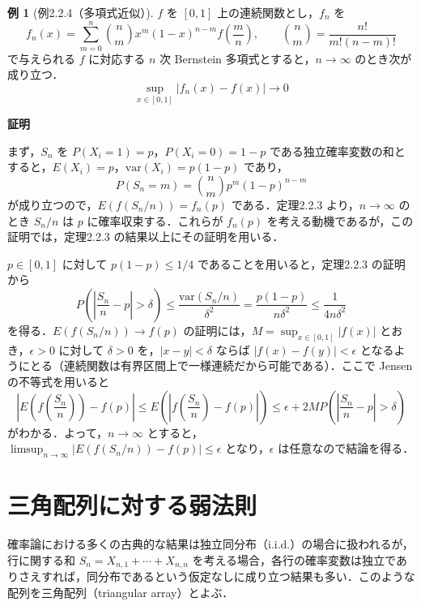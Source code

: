 \documentclass[dvipdfmx]{jsarticle}
\makeatletter
\numberwithin{equation}{section}
\theoremstyle{definition}
\newtheorem{ex}[thm]{例}
\renewenvironment{proof}[1][\proofname]{\par
  \pushQED{\qed}%
  \normalfont \topsep6\p@\@plus6\p@\relax
  \trivlist
  \item\relax
  {\bfseries
  #1\@addpunct{.}}\hspace\labelsep\ignorespaces
}{%
  \popQED\endtrivlist\@endpefalse
}
\renewcommand{\proofname}{証明}
\newcommand{\0}{\bm{0}}
\newcommand{\1}{\bm{1}}
\makeatother
\begin{document}
\begin{ex}[例2.2.4（多項式近似）]
$f$ を $[0,1]$ 上の連続関数とし，$f_n$ を
\[
  f_n(x) = \sum_{m=0}^n \binom{n}{m} x^m (1-x)^{n-m} f\!\left(\frac{m}{n}\right), \qquad
  \binom{n}{m} = \frac{n!}{m!(n-m)!}
\]
で与えられる $f$ に対応する $n$ 次 Bernstein 多項式とすると，$n \to \infty$ のとき次が成り立つ．
\[
  \sup_{x \in [0,1]} |f_n(x) - f(x)| \to 0
\]
\end{ex}

\begin{proof}
まず，$S_n$ を $P(X_i = 1) = p$，$P(X_i = 0) = 1-p$ である独立確率変数の和とすると，$E(X_i) = p$，$\mathrm{var}(X_i) = p(1-p)$ であり，
\[
  P(S_n = m) = \binom{n}{m} p^m (1-p)^{n-m}
\]
が成り立つので，$E(f(S_n/n)) = f_n(p)$ である．定理2.2.3 より，$n \to \infty$ のとき $S_n/n$ は $p$ に確率収束する．これらが $f_n(p)$ を考える動機であるが，この証明では，定理2.2.3 の結果以上にその証明を用いる．

$p \in [0,1]$ に対して $p(1-p) \le 1/4$ であることを用いると，定理2.2.3 の証明から
\[
  P\!\left(\left|\frac{S_n}{n} - p\right| > \delta\right)
  \le \frac{\mathrm{var}(S_n/n)}{\delta^2}
  = \frac{p(1-p)}{n\delta^2}
  \le \frac{1}{4n\delta^2}
\]
を得る．$E(f(S_n/n)) \to f(p)$ の証明には，$M = \sup_{x \in [0,1]} |f(x)|$ とおき，$\epsilon > 0$ に対して $\delta > 0$ を，$|x - y| < \delta$ ならば $|f(x) - f(y)| < \epsilon$ となるようにとる（連続関数は有界区間上で一様連続だから可能である）．ここで Jensen の不等式を用いると
\[
  \left|E\!\left(f\!\left(\frac{S_n}{n}\right)\right) - f(p)\right|
  \le E\!\left(\left|f\!\left(\frac{S_n}{n}\right) - f(p)\right|\right)
  \le \epsilon + 2M P\!\left(\left|\frac{S_n}{n} - p\right| > \delta\right)
\]
がわかる．よって，$n \to \infty$ とすると，$\limsup_{n\to\infty} |E(f(S_n/n)) - f(p)| \le \epsilon$ となり，$\epsilon$ は任意なので結論を得る．
\end{proof}

\section{三角配列に対する弱法則}

確率論における多くの古典的な結果は独立同分布（i.i.d.）の場合に扱われるが，行に関する和 $S_n = X_{n,1} + \cdots + X_{n,n}$ を考える場合，各行の確率変数は独立でありさえすれば，同分布であるという仮定なしに成り立つ結果も多い．このような配列を三角配列（triangular array）とよぶ．
\end{document}
